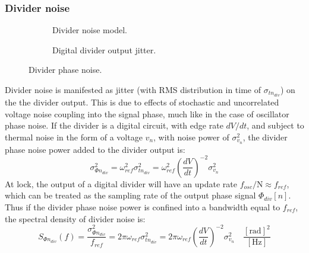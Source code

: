 \subsubsection{Divider noise}
	\begin{figure}[htb!]
	    \centering
	    \begin{subfigure}{0.5\textwidth}
	        \centering
	        
	        \caption{Divider noise model.}
	        \label{fig:div_pn_model}
	    \end{subfigure}%
	    \begin{subfigure}{0.5\textwidth}
	        \centering
	        
	        \caption{Digital divider output jitter.}
	        \label{fig:div_jitter}
	    \end{subfigure}
	    \label{fig:div_pn}
	    \caption{Divider phase noise.}
	\end{figure}
	\FloatBarrier
	Divider noise is manifested as jitter (with RMS distribution in time of $\sigma_{t n_{div}}$) on the the divider output. This is due to effects of stochastic and uncorrelated voltage noise coupling into the signal phase, much like in the case of oscillator phase noise. If the divider is a digital circuit, with edge rate $dV/dt$, and subject to thermal noise in the form of a  voltage $v_n$, with noise power of $\sigma_{v_n}^2$, the divider phase noise power added to the divider output is:
	\begin{equation}
		\sigma_{\Phi n_{div}}^2 = \omega^2_{ref}\sigma^2_{t n_{div}}  =\omega^2_{ref}\left(\frac{dV}{dt}\right)^{-2}\sigma_{v_n}^2
	\end{equation}
	At lock, the output of a digital divider will have an update rate $f_{{osc}}/\mathrm{N} \approx f_{ref}$, which can be treated as the sampling rate of the output phase signal $\Phi_{div}[n]$. Thus if the divider phase noise power is confined into a bandwidth equal to $f_{ref}$, the spectral density of divider noise is:
	\begin{equation}
		S_{\Phi n_{div}}(f) = \frac{\sigma_{\Phi n_{div}}^2}{f_{ref}} = 2\pi\omega_{ref}\sigma^2_{t n_{div}}  =2\pi\omega_{ref}\left(\frac{dV}{dt}\right)^{-2}\sigma_{v_n}^2\hspace{1em}\frac{[\text{rad}]^2}{[\text{Hz}]}
	\end{equation}

